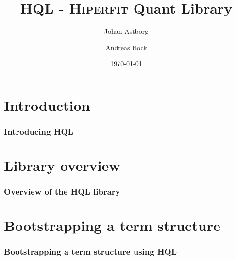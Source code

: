 \documentclass[]{beamer}
\title{\textbf{HQL} - \textsc{Hiperfit} Quant Library}    %
\author[shortname]{Johan Astborg \inst{1} \and Andreas Bock \inst{2}}
\institute[shortinst]{\inst{1} Lund University \and %
                      \inst{2} University of Copenhagen}
\date{\today}                    %
\begin{document}
\begin{frame}
  \titlepage
\end{frame}

\section[Outline]{}

\begin{frame}
  \tableofcontents
\end{frame}


\section{Introduction}

\begin{frame}
  \frametitle{Introducing HQL}   %

\end{frame}
\note[enumerate]       %
{                      %
}





\section{Library overview}
\begin{frame}
\frametitle{Overview of the HQL library}
	\begin{center}
		
	\end{center}
\end{frame}

\section{Bootstrapping a term structure}
\begin{frame}
	\frametitle{Bootstrapping a term structure using HQL}
	
\end{frame}
	
\end{document}
